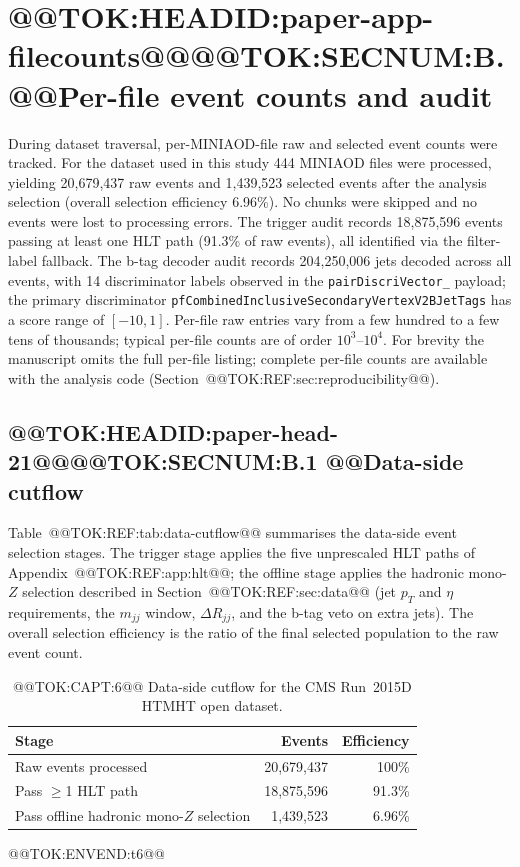 \documentclass[11pt]{article}
\begin{document}
\section{@@TOK:HEADID:paper-app-filecounts@@@@TOK:SECNUM:B. @@Per-file event counts and audit}

During dataset traversal, per-MINIAOD-file raw and selected event counts
were tracked. For the dataset used in this study 444 MINIAOD files were
processed, yielding 20{,}679{,}437 raw events and 1{,}439{,}523 selected
events after the analysis selection (overall selection efficiency 6.96\%).
No chunks were skipped and no events were lost to processing errors. The
trigger audit records 18{,}875{,}596 events passing at least one HLT path
(91.3\% of raw events), all identified via the filter-label fallback. The
b-tag decoder audit records 204{,}250{,}006 jets decoded across all events,
with 14 discriminator labels observed in the \texttt{pairDiscriVector\_}
payload; the primary discriminator
\texttt{pfCombinedInclusiveSecondaryVertexV2BJetTags} has a score range of
$[-10, 1]$. Per-file raw entries vary from a few hundred to a few tens of
thousands; typical per-file counts are of order $10^{3}$--$10^{4}$. For
brevity the manuscript omits the full per-file listing; complete per-file
counts are available with the analysis code
(Section~@@TOK:REF:sec:reproducibility@@).

\subsection{@@TOK:HEADID:paper-head-21@@@@TOK:SECNUM:B.1 @@Data-side cutflow}

Table~@@TOK:REF:tab:data-cutflow@@ summarises the data-side event selection
stages. The trigger stage applies the five unprescaled HLT paths of
Appendix~@@TOK:REF:app:hlt@@; the offline stage applies the hadronic mono-$Z$
selection described in Section~@@TOK:REF:sec:data@@ (jet $p_T$ and $\eta$
requirements, the $m_{jj}$ window, $\Delta R_{jj}$, and the b-tag veto on
extra jets). The overall selection efficiency is the ratio of the final
selected population to the raw event count.

\begin{table}[H]
  \centering
  \caption{@@TOK:CAPT:6@@ Data-side cutflow for the CMS Run~2015D HTMHT open dataset.}
  \label{tab:data-cutflow}
  \begin{tabular}{@{}>{\raggedright\arraybackslash}p{}rr@{}}
    \toprule
    Stage & Events & Efficiency \\
    \midrule
    Raw events processed & 20{,}679{,}437 & 100\% \\
    Pass $\geq$1 HLT path & 18{,}875{,}596 & 91.3\% \\
    Pass offline hadronic mono-$Z$ selection & 1{,}439{,}523 & 6.96\% \\
    \bottomrule
  \end{tabular}
@@TOK:ENVEND:t6@@\end{table}
\end{document}
